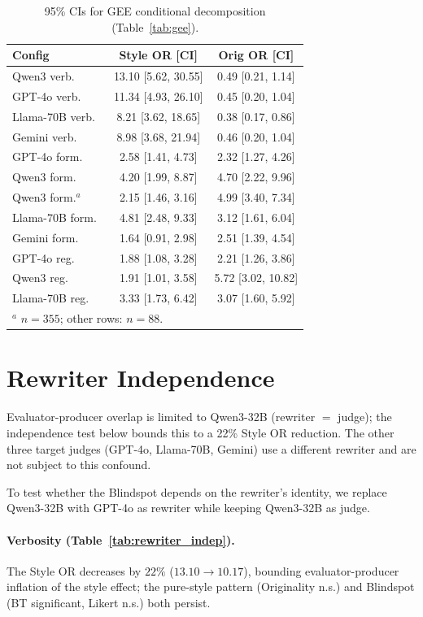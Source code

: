 \begin{table}[h]
\centering
\small
\caption{95\% CIs for GEE conditional decomposition (Table~\ref{tab:gee}).}
\label{tab:gee_ci}
\begin{tabular}{@{}lcc@{}}
\toprule
Config & Style OR [CI] & Orig OR [CI] \\
\midrule
Qwen3 verb.\ & 13.10 [5.62, 30.55] & 0.49 [0.21, 1.14] \\
GPT-4o verb.\ & 11.34 [4.93, 26.10] & 0.45 [0.20, 1.04] \\
Llama-70B verb.\ & 8.21 [3.62, 18.65] & 0.38 [0.17, 0.86] \\
Gemini verb.\ & 8.98 [3.68, 21.94] & 0.46 [0.20, 1.04] \\
GPT-4o form.\ & 2.58 [1.41, 4.73] & 2.32 [1.27, 4.26] \\
Qwen3 form.\ & 4.20 [1.99, 8.87] & 4.70 [2.22, 9.96] \\
Qwen3 form.$^a$ & 2.15 [1.46, 3.16] & 4.99 [3.40, 7.34] \\
Llama-70B form.\ & 4.81 [2.48, 9.33] & 3.12 [1.61, 6.04] \\
Gemini form.\ & 1.64 [0.91, 2.98] & 2.51 [1.39, 4.54] \\
GPT-4o reg.\ & 1.88 [1.08, 3.28] & 2.21 [1.26, 3.86] \\
Qwen3 reg.\ & 1.91 [1.01, 3.58] & 5.72 [3.02, 10.82] \\
Llama-70B reg.\ & 3.33 [1.73, 6.42] & 3.07 [1.60, 5.92] \\
\bottomrule
\multicolumn{3}{l}{\footnotesize $^a$ $n = 355$; other rows: $n = 88$.}
\end{tabular}
\end{table}

\section{Rewriter Independence}
\label{app:rewriter_indep}

Evaluator-producer overlap is limited to Qwen3-32B (rewriter $=$ judge); the independence test below bounds this to a 22\% Style OR reduction. The other three target judges (GPT-4o, Llama-70B, Gemini) use a different rewriter and are not subject to this confound.

To test whether the Blindspot depends on the rewriter's identity, we replace Qwen3-32B with GPT-4o as rewriter while keeping Qwen3-32B as judge.

\paragraph{Verbosity (Table~\ref{tab:rewriter_indep}).}
The Style OR decreases by $22\%$ ($13.10 \to 10.17$), bounding evaluator-producer inflation of the style effect; the pure-style pattern (Originality n.s.) and Blindspot (BT significant, Likert n.s.) both persist.

